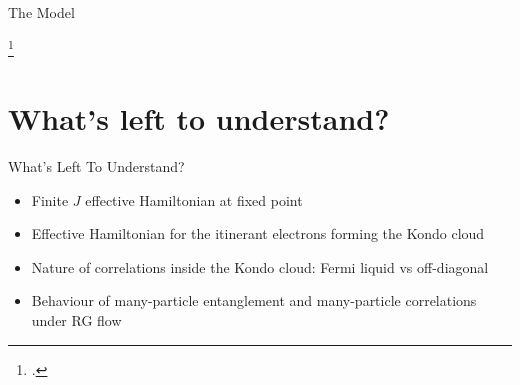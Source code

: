 \documentclass[aspectratio=169]{beamer}
\begin{document}
\begin{frame}[noframenumbering]{The Model}
{\begin{minipage}{0.6\textwidth}
\end{minipage}
\begin{minipage}{0.35\textwidth}
\end{minipage}
\footcite{anderson1969exact,anderson1970,wilson1975,andreiKondoreview,andrei_kondo,wiegmann_kondoexact_1981}
}
\end{frame}

\section{What's left to understand?}
\begin{frame}[noframenumbering]{What's Left To Understand?}
  
\begin{itemize}[<+-|alert@+>]
	\item Finite \(J\) effective Hamiltonian at fixed point
	\vspace*{20pt}
	\item Effective Hamiltonian for the itinerant electrons forming the Kondo cloud
	\vspace*{20pt}
	\item Nature of correlations inside the Kondo cloud: Fermi liquid vs off-diagonal
	\vspace*{20pt}
	\item Behaviour of many-particle entanglement and many-particle correlations under RG flow
\end{itemize}

\end{frame}
\end{document}
